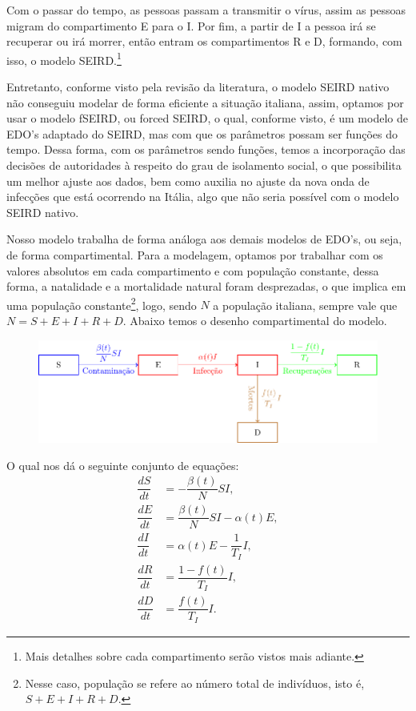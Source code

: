 \documentclass{article}
\begin{document}
Com o passar do tempo, as pessoas passam a transmitir o vírus, assim as pessoas migram do compartimento E para o I. Por fim, a partir de I a pessoa irá se recuperar ou irá morrer, então entram os compartimentos R e D, formando, com isso, o modelo SEIRD.\footnote{Mais detalhes sobre cada compartimento serão vistos %
mais adiante.}

Entretanto, conforme visto pela revisão da literatura, o modelo SEIRD nativo não conseguiu modelar de forma eficiente a situação italiana, assim, optamos por usar o modelo fSEIRD, ou forced SEIRD, o qual, conforme visto, é um modelo de EDO's adaptado do SEIRD, mas com que os parâmetros possam ser funções do tempo. Dessa forma, com os parâmetros sendo funções, temos a incorporação das decisões de autoridades à respeito do grau de isolamento social, o que possibilita um melhor ajuste aos dados, bem como auxilia no ajuste da nova onda de infecções que está ocorrendo na Itália, algo que não seria possível com o modelo SEIRD nativo.

% 
Nosso modelo trabalha de forma análoga aos demais modelos de EDO's, ou seja, de forma compartimental. Para a modelagem, optamos por trabalhar com os valores absolutos em cada compartimento e com população constante, dessa forma, a natalidade e a mortalidade natural foram desprezadas, o que implica em uma população constante\footnote{Nesse caso, população se refere ao número total de indivíduos, isto é, $S + E + I + R + D$.}, logo, sendo $N$ a população italiana, sempre vale que $N = S + E + I + R + D$. Abaixo temos o desenho compartimental do modelo.
\begin{figure}[H]
    \centering
    \includegraphics[page = 1]{Tikz - PDF/Tikz3.pdf}
\end{figure}

O qual nos dá o seguinte conjunto de equações:
\begin{equation}
    \label{fSEIRD}
    \begin{split}
        \dfrac{dS}{dt} & = -\dfrac{\beta(t)}{N}SI, \\
        \dfrac{dE}{dt} & = \dfrac{\beta(t)}{N}SI - \alpha(t) E, \\
        \dfrac{dI}{dt} & = \alpha(t) E - \dfrac{1}{T_I}I, \\
        \dfrac{dR}{dt} & = \dfrac{1 - f(t)}{T_I}I, \\
        \dfrac{dD}{dt} & = \dfrac{f(t)}{T_I}I.
    \end{split}
\end{equation}
\end{document}
